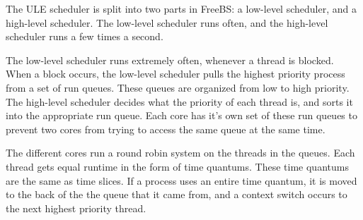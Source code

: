 \documentclass[10pt,letterpaper,onecolumn,draftclsnofoot]{IEEEtran}
\begin{document}
The ULE scheduler is split into two parts in FreeBS: a low-level scheduler, and
a high-level scheduler. The low-level scheduler runs often, and the high-level
scheduler runs a few times a second.

The low-level scheduler runs extremely often, whenever a thread is blocked. When
a block occurs, the low-level scheduler pulls the highest priority process from
a set of run queues. These queues are organized from low to high priority. The
high-level scheduler decides what the priority of each thread is, and sorts it
into the appropriate run queue. Each core has it's own set of these run queues
to prevent two cores from trying to access the same queue at the same time.

The different cores run a round robin system on the threads in the queues. Each
thread gets equal runtime in the form of time quantums. These time quantums are
the same as time slices. If a process uses an entire time quantum, it is moved
to the back of the the queue that it came from, and a context switch occurs to the
next highest priority thread.\cite{kirkgeorgebsd}
\clearpage
\end{document}

